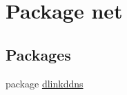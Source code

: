 \hypertarget{namespacenet}{}\section{Package net}
\label{namespacenet}
\subsection*{Packages}
\begin{DoxyCompactItemize}
\item 
package \mbox{\hyperlink{namespacenet_1_1dlinkddns}{dlinkddns}}
\end{DoxyCompactItemize}
